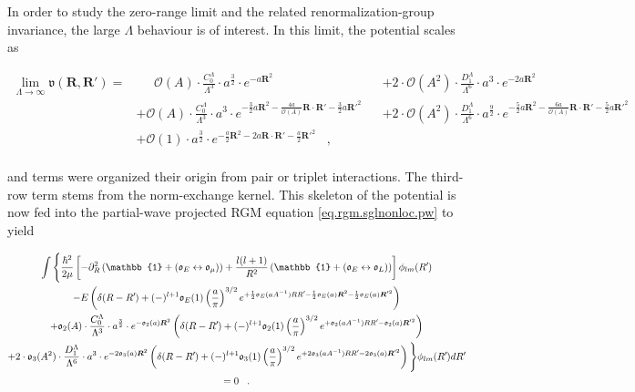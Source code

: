 \documentclass
[aps,nofootinbib,prl,showpacs,twocolumn,groupedaddress,superscriptaddress]
{revtex4}
\newcommand*{\mprime}{^{\prime}\mkern-1.2mu}
\newcommand{\la}{\label}
\newcommand{\ve}[1]{\ensuremath{\boldsymbol{#1}}}
\begin{document}
In order to study the zero-range limit and the related renormalization-group invariance, the large $\Lambda$
behaviour is of interest. In this limit, the potential scales as
%
\begin{widetext}
\begin{align*}
\lim_{\Lambda\to\infty}\mathfrak{v}(\ve{R},\ve{R}')=&\;\;\;\;\;\mathcal{O}(A)\cdot\frac{C_0^\Lambda}{\Lambda^3}\cdot a^{\frac{3}{2}}\cdot e^{-a\ve{R}^2}
&&+2\cdot\mathcal{O}(A^2)\cdot \frac{D_1^\Lambda}{\Lambda^6}\cdot a^3\cdot e^{-2a\ve{R}^2}\\
&+\mathcal{O}(A)\cdot\frac{C_0^\Lambda}{\Lambda^3}\cdot a^{3}\cdot e^{-\frac{3}{2}a\ve{R}^2-\frac{4a}{\mathcal{O}(A)}\ve{R}\cdot\ve{R}'-\frac{3}{2}a\ve{R}'^2}
&&+2\cdot\mathcal{O}(A^2)\cdot\frac{D_1^\Lambda}{\Lambda^6}\cdot a^{\frac{9}{2}}\cdot e^{-\frac{5}{2}a\ve{R}^2-\frac{6a}{\mathcal{O}(A)}\ve{R}\cdot\ve{R}'-\frac{5}{2}a\ve{R}'^2}\\
&+\mathcal{O}(1)\cdot a^{\frac{3}{2}}\cdot e^{-\frac{a}{2}\ve{R}^2-2a\ve{R}\cdot\ve{R}'-\frac{a}{2}\ve{R}'^2}\;\;\;,&&\\
\end{align*}
\end{widetext}
and terms were organized their origin from pair or triplet interactions. The third-row term stems from the norm-exchange
kernel. This skeleton of the potential is now fed into the partial-wave projected RGM equation \eqref{eq.rgm.sglnonloc.pw}
to yield
%
\begin{widetext}
\begin{subequations}\la{eq.rgm.pw}
\begin{gather}
\int\Bigg\lbrace\frac{\hbar^2}{2\mu}\left[-\partial^2_R\left(\mathbb{1}+(\mathfrak{o}_E\leftrightarrow\mathfrak{o}_\mu)\right)+
\frac{l(l+1)}{R^2}\left(\mathbb{1}+(\mathfrak{o}_E\leftrightarrow\mathfrak{o}_L)\right)\right]
\phi_{lm}(R\mprime)\la{eq.rgm.pw.a}\\
%
-E\left(\delta(R-R\mprime)+(-)^{l+1}\mathfrak{o}_E(1)\left(\frac{a}{\pi}\right)^{3/2}
e^{+\frac{1}{2}\mathfrak{o}_E(aA^{-1})RR\mprime-\frac{1}{2}\mathfrak{o}_E(a)\ve{R}^2-\frac{1}{2}\mathfrak{o}_E(a)\ve{R}'^2}\right)\la{eq.rgm.pw.b}\\
%
+\mathfrak{o}_2(A)\cdot\frac{C_0^\Lambda}{\Lambda^3}\cdot a^{\frac{3}{2}}\cdot
e^{-\mathfrak{o}_2(a)\ve{R}^2}
\left(\delta(R-R\mprime)+(-)^{l+1}\mathfrak{o}_2(1)\left(\frac{a}{\pi}\right)^{3/2}
e^{+\mathfrak{o}_2(aA^{-1})RR\mprime-\mathfrak{o}_2(a)\ve{R}'^2}\right)\la{eq.rgm.pw.c}\\
%
+2\cdot\mathfrak{o}_3(A^2)\cdot\frac{D_1^\Lambda}{\Lambda^6}\cdot a^{3}\cdot
e^{-2\mathfrak{o}_3(a)\ve{R}^2}
\left(\delta(R-R\mprime)+(-)^{l+1}\mathfrak{o}_3(1)\left(\frac{a}{\pi}\right)^{3/2}
e^{+2\mathfrak{o}_3(aA^{-1})RR\mprime-2\mathfrak{o}_3(a)\ve{R}'^2}\right)
\Bigg\rbrace\phi_{lm}(R\mprime)dR\mprime\la{eq.rgm.pw.d}\\
 =0\;\;\;.\nonumber
\end{gather}
\end{subequations}
\end{widetext}
\end{document}
